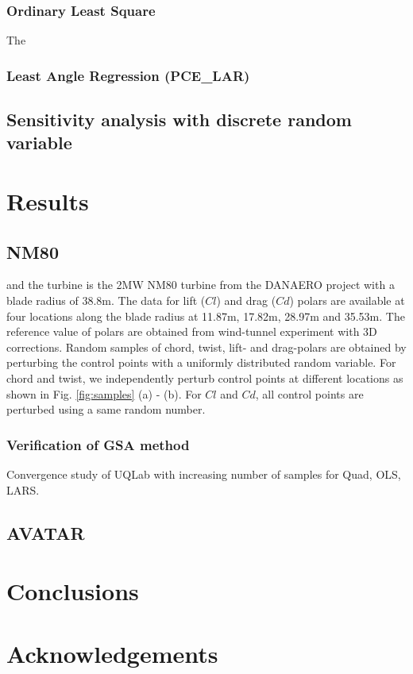 \documentclass[review]{elsarticle}
\numberwithin{equation}{section}
\newcommand{\myreferences}{../references,../Mendeley_refs}
\numberwithin{equation}{section}
\begin{document}
\subsubsection{Ordinary Least Square}
The 
\subsubsection{Least Angle Regression (PCE\_LAR)}
\subsection{Sensitivity analysis with discrete random variable}
\section{Results}\label{sec:results}

\subsection{NM80}
 and the turbine is the 2MW NM80 turbine from the DANAERO project \cite{Troldborg2013} with a blade radius of 38.8m. The data for lift ($Cl$) and drag ($Cd$) polars are available at four locations along the blade radius at 11.87m, 17.82m, 28.97m and 35.53m. The reference value of polars are obtained from wind-tunnel experiment with 3D corrections. Random samples of chord, twist, lift- and drag-polars are obtained by perturbing the control points with a uniformly distributed random variable. For chord and twist, we independently perturb control points at different locations as shown in Fig. \ref{fig:samples} (a) - (b). For $Cl$ and $Cd$, all control points are perturbed using a same random number.
 
\subsubsection{Verification of GSA method}
Convergence study of UQLab with increasing number of samples for Quad, OLS, LARS.

\subsection{AVATAR}

\section{Conclusions}\label{sec:conclusions}

\section*{Acknowledgements}

\newpage


\newpage

\appendix

\end{document}
